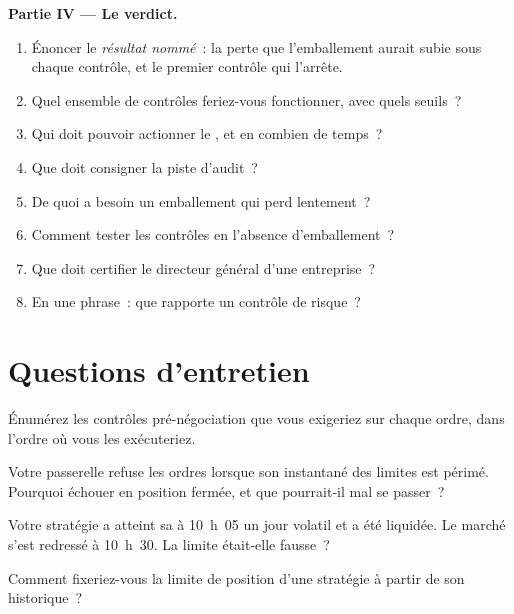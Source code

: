 \begin{problem}
\medskip\noindent\textbf{Partie IV --- Le verdict.}
\begin{enumerate}[resume]
\item Énoncer le \emph{résultat nommé}~: la perte que l'emballement aurait subie sous chaque contrôle, et le premier contrôle qui l'arrête.
\item Quel ensemble de contrôles feriez-vous fonctionner, avec quels seuils~?
\item Qui doit pouvoir actionner le , et en combien de temps~?
\item Que doit consigner la piste d'audit~?
\item De quoi a besoin un emballement qui perd lentement~?
\item Comment tester les contrôles en l'absence d'emballement~?
\item Que doit certifier le directeur général d'une entreprise~?
\item En une phrase~: que rapporte un contrôle de risque~?
\end{enumerate}
\end{problem}

\section{Questions d'entretien}

\begin{interviewq}\label{iq:hf:risk-controls:1}
Énumérez les contrôles pré-négociation que vous exigeriez sur chaque ordre, dans l'ordre où vous les exécuteriez.
\end{interviewq}

\begin{interviewq}\label{iq:hf:risk-controls:2}
Votre passerelle refuse les ordres lorsque son instantané des limites est périmé. Pourquoi échouer en position fermée, et que pourrait-il mal se passer~?
\end{interviewq}

\begin{interviewq}\label{iq:hf:risk-controls:3}
Votre stratégie a atteint sa  à 10~h~05 un jour volatil et a été liquidée. Le marché s'est redressé à 10~h~30. La limite était-elle fausse~?
\end{interviewq}

\begin{interviewq}\label{iq:hf:risk-controls:4}
Comment fixeriez-vous la limite de position d'une stratégie à partir de son historique~?
\end{interviewq}

